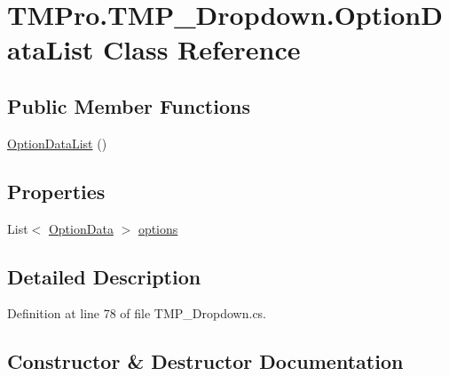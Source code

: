 \hypertarget{class_t_m_pro_1_1_t_m_p___dropdown_1_1_option_data_list}{}\section{T\+M\+Pro.\+T\+M\+P\+\_\+\+Dropdown.\+Option\+Data\+List Class Reference}
\label{class_t_m_pro_1_1_t_m_p___dropdown_1_1_option_data_list}
\subsection*{Public Member Functions}
\begin{DoxyCompactItemize}
\item 
\mbox{\hyperlink{class_t_m_pro_1_1_t_m_p___dropdown_1_1_option_data_list_a7d91c85ced0e0eca7c2341d4273993c8}{Option\+Data\+List}} ()
\end{DoxyCompactItemize}
\subsection*{Properties}
\begin{DoxyCompactItemize}
\item 
List$<$ \mbox{\hyperlink{class_t_m_pro_1_1_t_m_p___dropdown_1_1_option_data}{Option\+Data}} $>$ \mbox{\hyperlink{class_t_m_pro_1_1_t_m_p___dropdown_1_1_option_data_list_abdf0739ee1b292c91df8df0a19ea8509}{options}}
\end{DoxyCompactItemize}


\subsection{Detailed Description}


Definition at line 78 of file T\+M\+P\+\_\+\+Dropdown.\+cs.



\subsection{Constructor \& Destructor Documentation}
\mbox{\label{class_t_m_pro_1_1_t_m_p___dropdown_1_1_option_data_list_a7d91c85ced0e0eca7c2341d4273993c8}} 
